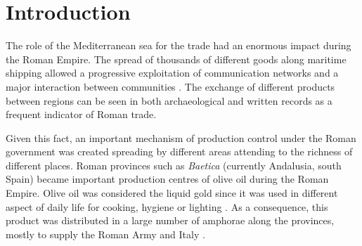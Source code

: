 \documentclass[review]{elsarticle}
\newcommand{\memo}[2]{\textcolor{#1}{#2}}
\newcommand{\xavi}[1]{\memo{magenta}{XRC: #1\\}}
\begin{document}
\section{Introduction}




The role of the Mediterranean sea for the trade had an enormous impact during the Roman Empire. The spread of thousands of different goods along maritime shipping allowed a progressive exploitation of communication networks and a major interaction between communities \citep{rodriguez_baetican_1998, 
temin_market_2001,
bevan_mediterranean_2014}. The exchange of different products between regions can be seen in both archaeological and written records as a frequent indicator of Roman trade.  


Given this fact, an important mechanism of production control under the Roman government was created spreading by different areas attending to the richness of different places. Roman provinces such as \textit{Baetica} (currently Andalusia, south Spain) became important production centres of olive oil during the Roman Empire. Olive oil was considered the liquid gold since it was used in different aspect of daily life for cooking, hygiene or lighting  \citep{mattingly_d.j._oil_1988}. As a consequence, this product was distributed in a large number of amphorae along the provinces, mostly to supply the Roman Army and Italy \citep{blazquez_exportacion_1980}. 
\end{document}
